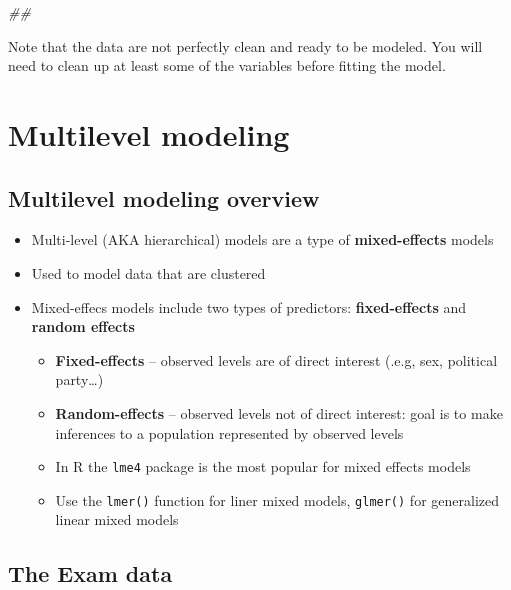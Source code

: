 \documentclass[]{book}
\newenvironment{Shaded}{\begin{snugshade}}{\end{snugshade}}
\newcommand{\CommentTok}[1]{\textcolor[rgb]{0.56,0.35,0.01}{\textit{#1}}}
\providecommand{\tightlist}{%
  \setlength{\itemsep}{0pt}\setlength{\parskip}{0pt}}
\begin{document}
\begin{Shaded}
\begin{Highlighting}[]
\CommentTok{## }
\end{Highlighting}
\end{Shaded}

Note that the data are not perfectly clean and ready to be modeled. You will need to clean up at least some of the variables before fitting the model.

\hypertarget{multilevel-modeling}{%
\section{Multilevel modeling}\label{multilevel-modeling}}

\hypertarget{multilevel-modeling-overview}{%
\subsection{Multilevel modeling overview}\label{multilevel-modeling-overview}}

\begin{itemize}
\tightlist
\item
  Multi-level (AKA hierarchical) models are a type of \textbf{mixed-effects} models
\item
  Used to model data that are clustered
\item
  Mixed-effecs models include two types of predictors: \textbf{fixed-effects} and \textbf{random effects}

  \begin{itemize}
  \tightlist
  \item
    \textbf{Fixed-effects} -- observed levels are of direct interest (.e.g, sex, political party\ldots)
  \item
    \textbf{Random-effects} -- observed levels not of direct interest: goal is to make inferences to a population represented by observed levels
  \item
    In R the \texttt{lme4} package is the most popular for mixed effects models
  \item
    Use the \texttt{lmer()} function for liner mixed models, \texttt{glmer()} for generalized linear mixed models
  \end{itemize}
\end{itemize}

\hypertarget{the-exam-data}{%
\subsection{The Exam data}\label{the-exam-data}}
\end{document}
